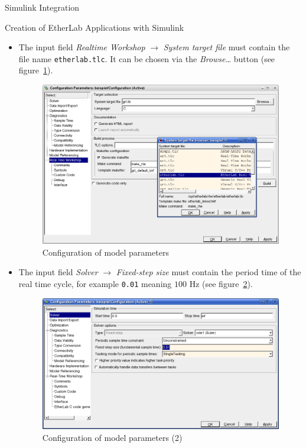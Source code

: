 \begin{ighsec}{Simulink Integration}
\begin{ighsec}{Creation of EtherLab Applications with Simulink}
\begin{itemize}
\item The input field \textit{Realtime Workshop} $\rightarrow$
  \textit{System target file} must contain the file name
  \texttt{etherlab.tlc}. It can be chosen via the
  \textit{Browse\ldots} button (see figure~\ref{fig:konfiguration}).
  \begin{figure}[H]
    \begin{center}
      \includegraphics[width=.9\textwidth]{images/config_param.png}
      \caption{Configuration of model parameters}
      \label{fig:konfiguration}
    \end{center}
  \end{figure}
\item The input field \textit{Solver} $\rightarrow$ \textit{Fixed-step
    size} must contain the period time of the real time cycle, for
  example \texttt{0.01} meaning $100$ Hz (see
  figure~\ref{fig:config_solver}).
  \begin{figure}[H]
    \begin{center}
      \includegraphics[width=.9\textwidth]{images/config_solver.png}
      \caption{Configuration of model parameters (2)}
      \label{fig:config_solver}
    \end{center}
  \end{figure}
\end{itemize}


\end{ighsec}
\end{ighsec}
